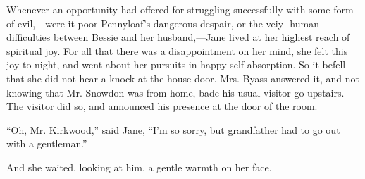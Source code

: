 Whenever an opportunity had offered for struggling successfully with
some form of evil,---were it poor Pennyloaf's dangerous despair, or the
veiy- human difficulties between Bessie and her husband,---Jane lived at
her highest {}reach of spiritual joy. For all that there was a
disappointment on her mind, she felt this joy to-night, and went about
her pursuits in happy self-absorption. So it befell that she did not
hear a knock at the house-door. Mrs. Byass answered it, and not knowing
that Mr. Snowdon was from home, bade his usual visitor go upstairs. The
visitor did so, and announced his presence at the door of the room.

``Oh, Mr. Kirkwood,'' said Jane, ``I'm so sorry, but grandfather had to
go out with a gentleman.''

And she waited, looking at him, a gentle warmth on her face.
